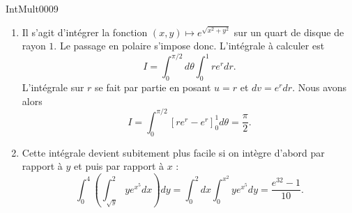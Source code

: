 
\begin{corrige}{IntMult0009}

	\begin{enumerate}

		\item
			Il s'agit d'intégrer la fonction $(x,y)\mapsto  e^{\sqrt{x^2+y^2}}$ sur un quart de disque de rayon $1$. Le passage en polaire s'impose donc. L'intégrale à calculer est
			\begin{equation}
				I=\int_0^{\pi/2}d\theta\int_0^1r e^{r}dr.
			\end{equation}
			L'intégrale sur $r$ se fait par partie en posant $u=r$ et $dv=e^rdr$. Nous avons alors
			\begin{equation}
				I=\int_0^{\pi/2}[re^r-e^r]_0^1d\theta=\frac{ \pi }{ 2 }.
			\end{equation}
			
		\item
			Cette intégrale devient subitement plus facile si on intègre d'abord par rapport à $y$ et puis par rapport à $x$ :
			\begin{equation}
				\int_0^4\left( \int_{\sqrt{y}}^2 y e^{x^5}dx \right)dy=\int_0^2dx\int_0^{x^2}y e^{x^5}dy=\frac{ e^{32}-1 }{ 10 }.
			\end{equation}

	\end{enumerate}
	
\end{corrige}
